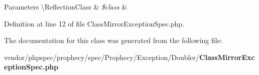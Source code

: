 \begin{DoxyParams}[1]{Parameters}
\textbackslash{}\+Reflection\+Class & {\em \$class} & \\
\hline
\end{DoxyParams}


Definition at line 12 of file Class\+Mirror\+Exception\+Spec.\+php.



The documentation for this class was generated from the following file\+:\begin{DoxyCompactItemize}
\item 
vendor/phpspec/prophecy/spec/\+Prophecy/\+Exception/\+Doubler/{\bf Class\+Mirror\+Exception\+Spec.\+php}\end{DoxyCompactItemize}
